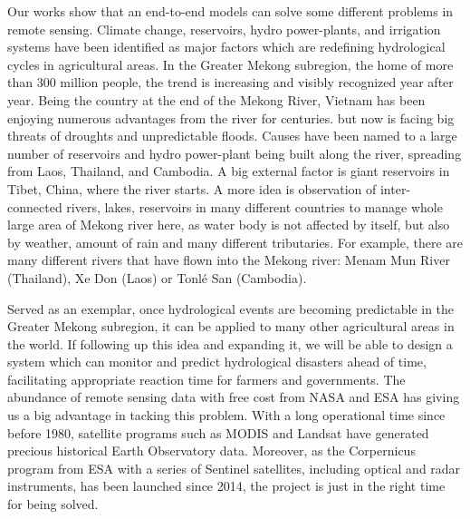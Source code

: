 Our works show that an end-to-end models can solve some different problems in remote sensing. Climate change, reservoirs, hydro power-plants, and irrigation systems have been identified as major factors which are redefining hydrological cycles in agricultural areas. In the Greater Mekong subregion, the home of more than 300 million people, the trend is increasing and visibly recognized year after year. Being the country at the end of the Mekong River, Vietnam has been enjoying numerous advantages from the river for centuries. but now is facing big threats of droughts and unpredictable floods. Causes have been named to a large number of reservoirs and hydro power-plant being built along the river, spreading from Laos, Thailand, and Cambodia. A big external factor is giant reservoirs in Tibet, China, where the river starts. A more idea is observation of inter-connected rivers, lakes, reservoirs in many different countries to manage whole large area of Mekong river here, as water body is not affected by itself, but also by weather, amount of rain and many different tributaries. For example, there are many different rivers that have flown into the Mekong river: Menam Mun River (Thailand), Xe Don (Laos) or Tonlé San (Cambodia). 

Served as an exemplar, once hydrological events are becoming predictable in the Greater Mekong subregion, it can be applied to many other agricultural areas in the world. If following up this idea and expanding it, we will be able to design a system which can monitor and predict hydrological disasters ahead of time, facilitating appropriate reaction time for farmers and governments. The abundance of remote sensing data with free cost from NASA and ESA has giving us a big advantage in tacking this problem. With a long operational time since before 1980, satellite programs such as MODIS and Landsat have generated precious historical Earth Observatory data. Moreover, as the Corpernicus program from ESA with a series of Sentinel satellites, including optical and radar instruments, has been launched since 2014, the project is just in the right time for being solved.